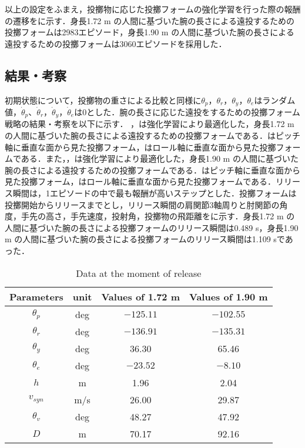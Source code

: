 以上の設定をふまえ，投擲物に応じた投擲フォームの強化学習を行った際の報酬の遷移をに示す．身長1.72 m の人間に基づいた腕の長さによる遠投するための投擲フォームは2983エピソード，身長1.90 m の人間に基づいた腕の長さによる遠投するための投擲フォームは3060エピソードを採用した．


\subsection{結果・考察}
初期状態について，投擲物の重さによる比較と同様に$\theta_{p}$，$\theta_{r}$，$\theta_{y}$，$\theta_{e}$はランダム値，$\dot{\theta}_{p}$、$\dot{\theta}_{r}$，$\dot{\theta}_{y}$，$\dot{\theta}_{e}$は0とした．腕の長さに応じた遠投をするための投擲フォーム戦略の結果・考察を以下に示す．
，は強化学習により最適化した，身長1.72 m の人間に基づいた腕の長さによる遠投するための投擲フォームである．はピッチ軸に垂直な面から見た投擲フォーム，はロール軸に垂直な面から見た投擲フォームである．また，，は強化学習により最適化した，身長1.90 m の人間に基づいた腕の長さによる遠投するための投擲フォームである．はピッチ軸に垂直な面から見た投擲フォーム，はロール軸に垂直な面から見た投擲フォームである．リリース瞬間は，1エピソードの中で最も報酬が高いステップとした．投擲フォームは投擲開始からリリースまでとし，リリース瞬間の肩関節3軸周りと肘関節の角度，手先の高さ，手先速度，投射角，投擲物の飛距離をに示す．身長1.72 m の人間に基づいた腕の長さによる投擲フォームのリリース瞬間は0.489 s，身長1.90 m の人間に基づいた腕の長さによる投擲フォームのリリース瞬間は1.109 sであった．

\begin{table}[tb]
  \begin{center}
    \caption{Data at the moment of release}

    \begin{tabular}{c|c|c|c}
      \hline
      Parameters & unit & Values of 1.72 m & Values of 1.90 m \\
      \hline
      $\theta_{p}$ & deg & $-125.11$ & $-102.55$ \\
      $\theta_{r}$ & deg & $-136.91$ & $-135.31$ \\
      $\theta_{y}$ & deg  & 36.30 & 65.46 \\
      $\theta_{e}$ & deg & $-23.52$ & $-8.10$ \\
      $h$ & m & 1.96 & 2.04 \\
      $v_{syn}$ & m/s & 26.00 & 29.87 \\
      $\theta_{v}$ & deg & 48.27 & 47.92 \\
      $D$ & m & 70.17 & 92.16 \\
      \hline
    \end{tabular}
  \end{center}
\end{table}

